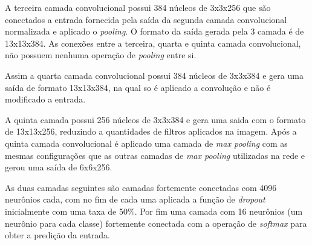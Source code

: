 \par A terceira camada convolucional possui 384 núcleos de 3x3x256 que são conectados a entrada fornecida pela saída da segunda camada convolucional normalizada e aplicado o \textit{pooling}. O formato da saída gerada pela 3 camada é de 13x13x384. As conexões entre a terceira, quarta e quinta camada convolucional, não possuem nenhuma operação de \textit{pooling} entre si. 
\par Assim a quarta camada convolucional possui 384 núcleos de 3x3x384 e gera uma saída de formato 13x13x384, na qual so é aplicado a convolução e não é modificado a entrada.
\par A quinta camada possui 256 núcleos de 3x3x384 e gera uma saida com o formato de 13x13x256, reduzindo a quantidades de filtros aplicados na imagem. Após a quinta camada convolucional é aplicado uma camada de \textit{max pooling} com as mesmas configurações que as outras camadas de \textit{max pooling} utilizadas na rede e gerou uma saída de 6x6x256.
\par As duas camadas seguintes são camadas fortemente conectadas com 4096 neurônios cada, com no fim de cada uma aplicada a função de \textit{dropout} inicialmente com uma taxa de 50\%. Por fim uma camada com 16 neurônios (um neurônio para cada classe) fortemente conectada com a operação de \textit{softmax} para obter a predição da entrada.

